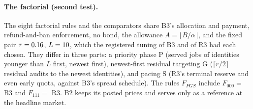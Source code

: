 \documentclass[11pt]{article}
\begin{document}
\paragraph{The factorial (second test).} The eight factorial rules and the comparators share B3's allocation and payment, refund-and-ban enforcement, no bond, the allowance $A = \lfloor B/\alpha \rfloor$, and the fixed pair $\tau = 0.16$, $L = 10$, which the registered tuning of B3 and of R3 had each chosen. They differ in three parts: a priority phase P (served jobs of identities younger than $L$ first, newest first), newest-first residual targeting G ($\lceil r/2 \rceil$ residual audits to the newest identities), and pacing S (R3's terminal reserve and even early quota, against B3's spread schedule). The rules $F_{PGS}$ include $F_{000} = $ B3 and $F_{111} = $ R3. B2 keeps its posted prices and serves only as a reference at the headline market.
\end{document}

